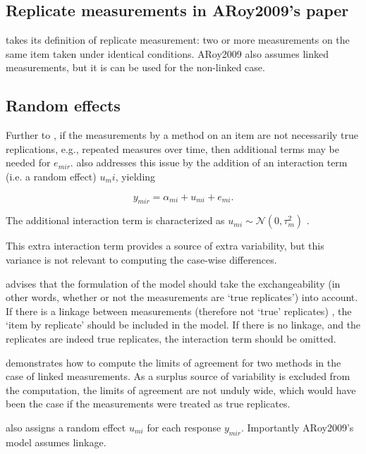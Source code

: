 \documentclass[12pt, a4paper]{report}
\theoremstyle{plain}
\theoremstyle{definition}
\theoremstyle{remark}
\begin{document}
	\subsection{Replicate measurements in ARoy2009's paper}
	\citet{ARoy2009} takes its definition of replicate measurement: two or more measurements on the same item taken
	under identical conditions. ARoy2009 also assumes linked measurements, but it is can be used for the non-linked case.
	
	\newpage
	\subsection{Random effects}
	
	Further to \citet{barnhart}, if the measurements by a method on an item are not necessarily true replications, e.g., repeated measures over time, then additional terms may be needed for $e_{mir}$. \citet{BXC2008} also addresses this issue by the addition of an interaction term (i.e. a random effect) $u_mi$, yielding
	
	\[ y_{mir} =  \alpha_{mi} + u_{mi} + e_{mi}.  \]
	
	The additional interaction term is characterized as $u_{mi}  \sim \mathcal{N}(0, \tau^2_m)$ \citep{BXC2008}.
	
	This extra interaction term provides a source of extra variability, but this variance is not relevant to computing the case-wise differences.
	
	\citet{BXC2008} advises that the formulation of the model should take the exchangeability (in other words, whether or not the measurements are `true replicates') into account. If there is a linkage between measurements (therefore not `true' replicates) , the `item by replicate' should be included in the model. If there is no linkage, and the replicates are indeed true replicates, the interaction term should be omitted.
	
	\citet{BXC2008} demonstrates how to compute the limits of agreement for two methods in the case of linked measurements. As a surplus source of variability is excluded from the computation, the limits of agreement are not unduly wide, which would have been the case if the measurements were treated as true replicates.
	
	\citet{ARoy2009} also assigns a random effect $u_{mi}$ for each response $y_{mir}$. Importantly ARoy2009's model assumes linkage.
	
\end{document}
